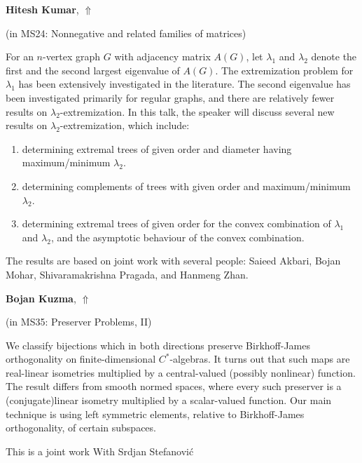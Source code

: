 \documentclass[ILAS2025-program.tex]{subfiles}
\begin{document}
\hypertarget{down0352}{}\begin{ilasabstract}
    
\textbf{Hitesh Kumar},  \hfill \hyperlink{up0352}{$\Uparrow$}
    
    
(in {\color{mstitle}MS24: Nonnegative and related families of matrices})
        
\mtskip
     For an $n$-vertex graph $G$ with adjacency matrix $A(G)$, let $\lambda_1$ and $\lambda_2$ denote the first and the second largest eigenvalue of $A(G)$. The extremization problem for $\lambda_1$ has been extensively investigated in the literature. The second eigenvalue has been investigated primarily for regular graphs, and there are relatively fewer results on $\lambda_2$-extremization. In this talk, the speaker will discuss several new results on $\lambda_2$-extremization, which include:
\begin{enumerate}
 \item determining extremal trees of given order and diameter having maximum/minimum $\lambda_2$.
 \item determining complements of trees with given order and maximum/minimum $\lambda_2$.
 \item determining extremal trees of given order for the convex combination of $\lambda_1$ and $\lambda_2$, and the asymptotic behaviour of the convex combination. 
\end{enumerate}
The results are based on joint work with several people: Saieed Akbari, Bojan Mohar,  Shivaramakrishna Pragada, and Hanmeng Zhan.

\end{ilasabstract}
    

\hypertarget{down0247}{}\begin{ilasabstract}
    
\textbf{Bojan Kuzma},  \hfill \hyperlink{up0247}{$\Uparrow$}
    
    
(in {\color{mstitle}MS35: Preserver Problems, II})
        
\mtskip
    We classify bijections which in both directions preserve Birkhoff-James orthogonality on finite-dimensional $C^*$-algebras. It turns out that such maps are  real-linear isometries  multiplied by a  central-valued (possibly nonlinear) function. The result differs from smooth normed spaces, where every such preserver is a (conjugate)linear isometry multiplied by a  scalar-valued function.
Our main technique  is using left symmetric elements, relative to Birkhoff-James orthogonality, of certain subspaces. 

This is a joint work With Srdjan Stefanovi\'c

\end{ilasabstract}
    
\end{document}
